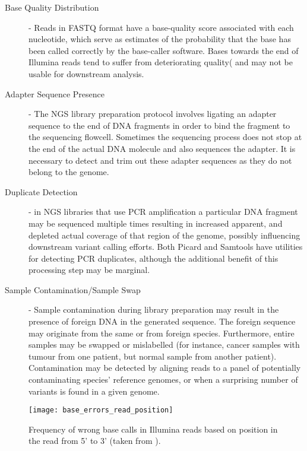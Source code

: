 \begin{description}
    \item [Base Quality Distribution] - Reads in FASTQ format have a base-quality score associated with each nucleotide, which serve as estimates of the probability that the base has been called correctly by the base-caller software. Bases towards the end of Illumina reads tend to suffer from deteriorating quality(\autocite{dohm2008substantial} and may not be usable for downstream analysis. 
    \item [Adapter Sequence Presence] - The NGS library preparation protocol involves ligating an adapter sequence to the end of DNA fragments in order to bind the fragment to the sequencing flowcell. Sometimes the sequencing process does not stop at the end of the actual DNA molecule and also sequences the adapter. It is necessary to detect and trim out these adapter sequences as they do not belong to the genome\autocite{bolger2014trimmomatic}.
    \item [Duplicate Detection] - in NGS libraries that use PCR amplification a particular DNA fragment may be sequenced multiple times resulting in increased apparent, and depleted actual coverage of that region of the genome, possibly influencing downstream variant calling efforts. Both Picard\autocite{Picard2018toolkit} and Samtools\autocite{li2011statistical} have utilities for detecting PCR duplicates, although the additional benefit of this processing step may be marginal\autocite{ebbert2016evaluating}.
    \item [Sample Contamination/Sample Swap] - Sample contamination during library preparation may result in the presence of foreign DNA in the generated sequence. The foreign sequence may originate from the same or from foreign species. Furthermore, entire samples may be swapped or mislabelled (for instance, cancer samples with tumour from one patient, but normal sample from another patient). Contamination may be detected by aligning reads to a panel of potentially contaminating species' reference genomes\autocite{zhou2013qc}, or when a surprising number of variants is found in a given genome.
\end{description}

\begin{figure}[h!]
    \texttt{[image: base\_errors\_read\_position]}
    \centering
    \caption {Frequency of wrong base calls in Illumina reads based on position in the read from 5' to 3' (taken from \autocite{dohm2008substantial}).}
    \label{fig:base_errors_read_position}
\end{figure}

